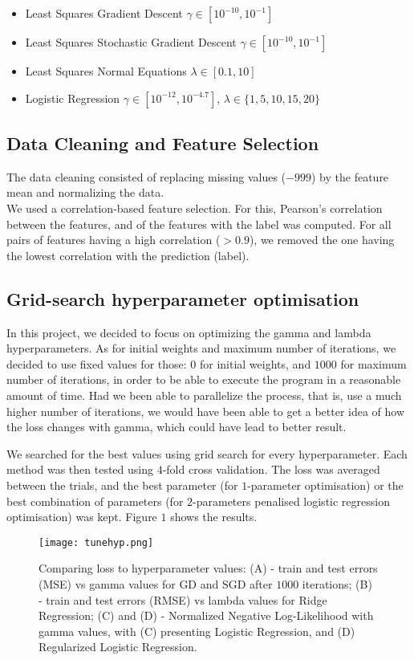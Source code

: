 \documentclass{article}
\begin{document}
		\begin{itemize}
			\item Least Squares Gradient Descent $\gamma \in [10^{-10}, 10^{-1}]$
			\item Least Squares Stochastic Gradient Descent $\gamma \in [10^{-10}, 10^{-1}]$
			\item Least Squares Normal Equations $\lambda \in [0.1, 10]$
			\item Logistic Regression $\gamma \in [10^{-12}, 10^{-4.7}]$, $\lambda \in \{1, 5, 10, 15, 20\} $
		\end{itemize}


	\subsection{Data Cleaning and Feature Selection}
	The data cleaning consisted of replacing missing values ($-999$) by the feature mean and normalizing the data.
	\\
	We used a correlation-based feature selection. For this, Pearson’s correlation between the features, and of the features with the label was computed. For all pairs of features having a high correlation ($> 0.9$), we removed the one having the lowest correlation with the prediction (label).

	\subsection{Grid-search hyperparameter optimisation}
	In this project, we decided to focus on optimizing the gamma and lambda hyperparameters. As for initial weights and maximum number of iterations, we decided to use fixed values for those: $0$ for initial weights, and $1000$ for maximum number of iterations, in order to be able to execute the program in a reasonable amount of time. Had we been able to parallelize the process, that is, use a much higher number of iterations, we would have been able to get a better idea of how the loss changes with gamma, which could have lead to better result.

	We searched for the best values using grid search for every hyperparameter. Each method was then tested using $4$-fold cross validation. The loss was averaged between the trials, and the best parameter (for $1$-parameter optimisation) or the best combination of parameters (for $2$-parameters penalised logistic regression optimisation) was kept. Figure $1$ shows the results.

	\begin{figure}\label{fig1}
		\centering
		\texttt{[image: tunehyp.png]}
		\caption{Comparing loss to hyperparameter values:
			(A) - train and test errors (MSE) vs gamma values for GD and SGD after $1000$ iterations;
			(B) - train and test errors (RMSE) vs lambda values for Ridge Regression;
			(C) and (D) - Normalized Negative Log-Likelihood with gamma values, with (C) presenting Logistic Regression, and (D) Regularized Logistic Regression.}
	\end{figure}
\end{document}
